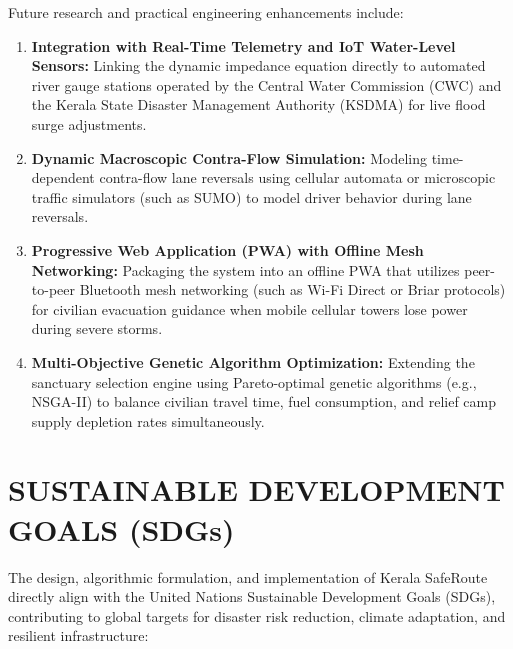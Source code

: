 \documentclass[12pt,oneside]{report}
\newcommand{\chapterpage}[1]{\chapter{#1}}
\begin{document}
Future research and practical engineering enhancements include:
\begin{enumerate}
    \item \textbf{Integration with Real-Time Telemetry and IoT Water-Level Sensors:} Linking the dynamic impedance equation directly to automated river gauge stations operated by the Central Water Commission (CWC) and the Kerala State Disaster Management Authority (KSDMA) for live flood surge adjustments.
    \item \textbf{Dynamic Macroscopic Contra-Flow Simulation:} Modeling time-dependent contra-flow lane reversals using cellular automata or microscopic traffic simulators (such as SUMO) to model driver behavior during lane reversals.
    \item \textbf{Progressive Web Application (PWA) with Offline Mesh Networking:} Packaging the system into an offline PWA that utilizes peer-to-peer Bluetooth mesh networking (such as Wi-Fi Direct or Briar protocols) for civilian evacuation guidance when mobile cellular towers lose power during severe storms.
    \item \textbf{Multi-Objective Genetic Algorithm Optimization:} Extending the sanctuary selection engine using Pareto-optimal genetic algorithms (e.g., NSGA-II) to balance civilian travel time, fuel consumption, and relief camp supply depletion rates simultaneously.
\end{enumerate}

\clearpage

\chapterpage{SUSTAINABLE DEVELOPMENT GOALS (SDGs)}

The design, algorithmic formulation, and implementation of Kerala SafeRoute directly align with the United Nations Sustainable Development Goals (SDGs), contributing to global targets for disaster risk reduction, climate adaptation, and resilient infrastructure:
\end{document}
